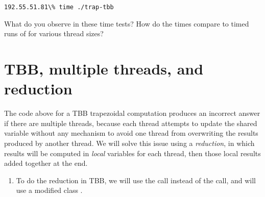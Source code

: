 \documentclass[letterpaper,10pt,openany,oneside]{sphinxmanual}
\begin{document}
\begin{Verbatim}[commandchars=\\\{\}]
192.55.51.81\% time ./trap-tbb
\end{Verbatim}

What do you observe in these time tests? How do the times compare to timed runs of  for various thread sizes?


\chapter{TBB, multiple threads, and reduction}
\label{MultipleThreadsAndReduction/MultipleThreadsAndReduction:tbb-multiple-threads-and-reduction}\label{MultipleThreadsAndReduction/MultipleThreadsAndReduction::doc}
The code above for a TBB trapezoidal computation produces an incorrect answer if there are multiple threads, because each thread attempts to update the shared variable  without any mechanism to avoid one thread from overwriting the results produced by another thread.  We will solve this issue using a \emph{reduction}, in which results will be computed in \emph{local} variables for each thread, then those local results added together at the end.
\begin{enumerate}
\item {} 
To do the reduction in TBB, we will use the  call instead of the  call, and will use a modified class .

\end{enumerate}
\end{document}
